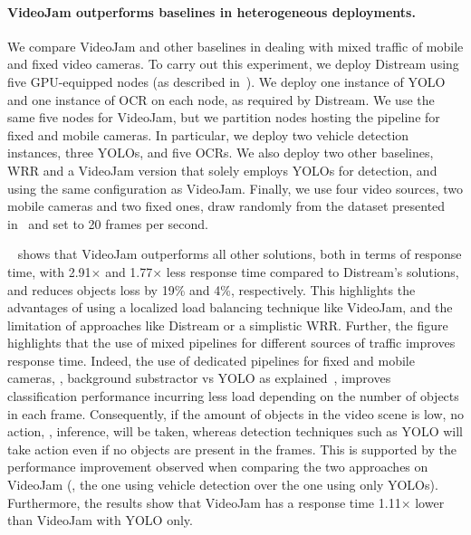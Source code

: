 \paragraph{VideoJam outperforms baselines in heterogeneous deployments.} We compare VideoJam and other baselines in dealing with mixed traffic of mobile and fixed video cameras. To carry out this experiment, we deploy Distream using five GPU-equipped nodes (as described in~). We deploy one instance of YOLO and one instance of OCR on each node, as required by Distream. We use the same five nodes for VideoJam, but we partition nodes hosting the pipeline for fixed and mobile cameras. In particular, we deploy two vehicle detection instances, three YOLOs, and five OCRs. We also deploy two other baselines, WRR and a VideoJam version that solely employs YOLOs for detection, and using the same configuration as VideoJam. Finally, we use four video sources, two mobile cameras and two fixed ones, draw randomly from the dataset presented in~ and set to 20 frames per second. 

~ shows that VideoJam outperforms all other solutions, both in terms of response time, with 2.91$\times$ and 1.77$\times$ less response time compared to Distream's solutions, and reduces objects loss by 19\% and 4\%, respectively. This highlights the advantages of using a localized load balancing technique like VideoJam, and the limitation of approaches like Distream or a simplistic WRR. Further, the figure highlights that the use of mixed pipelines for different sources of traffic improves response time.  Indeed, the use of dedicated pipelines for fixed and mobile cameras, \ie, background substractor vs YOLO as explained~, improves classification performance incurring less load depending on the number of objects in each frame. Consequently, if the amount of objects in the video scene is low, no action, \ie, inference, will be taken, whereas detection techniques such as YOLO will take action even if no objects are present in the frames. This is supported by the performance improvement observed when comparing the two approaches on VideoJam (\ie, the one using vehicle detection over the one using only YOLOs). Furthermore, the results show that VideoJam has a response time 1.11$\times$
lower than VideoJam with YOLO only.

